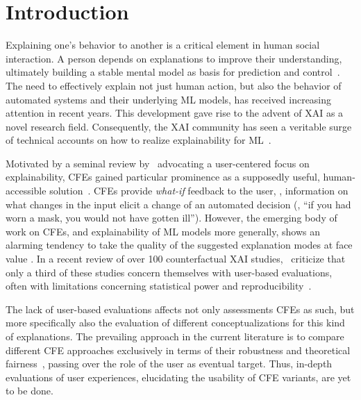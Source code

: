 \section{Introduction}\label{sec:introduction}

Explaining one's behavior to another is a critical element in human social interaction. 
A person depends on explanations to improve their understanding, ultimately building a stable mental model as basis for prediction and control~\citep{heider_psychology_1958}. 
The need to effectively explain not just human action, but also the behavior of automated systems and their underlying \gls{ML} models, has received increasing attention in recent years. This development gave rise to the advent of \gls{XAI} as a novel research field. 
Consequently, the \gls{XAI} community has seen a veritable surge of technical accounts on how to realize explainability for \gls{ML}~\citep{guidotti_survey_2019}. 

Motivated by a seminal review by~\citep{miller_explanation_2019} advocating a user-centered focus on explainability, \glspl{CFE} gained particular prominence as a supposedly useful, human-accessible solution~\citep{keane_if_2021}.
\glspl{CFE} provide \textit{what-if} feedback to the user, \ie, information on what changes in the input elicit a change of an automated decision (\ie, ``if you had worn a mask, you would not have gotten ill''). %
However, the emerging body of work on \glspl{CFE}, and explainability of \gls{ML} models more generally, shows an alarming tendency to take the quality of the suggested explanation modes at face value \citep{doshi-velez_towards_2017, offert_i_2017}.
In a recent review of over 100 counterfactual XAI studies,~\citeauthor{keane_if_2021} criticize that only a third of these studies concern themselves with user-based evaluations, often with limitations concerning statistical power and reproducibility~\citep{keane_if_2021}.

The lack of user-based evaluations affects not only assessments \glspl{CFE} as such, but more specifically also the evaluation of different conceptualizations for this kind of explanations.
The prevailing approach in the current literature is to compare different \gls{CFE} approaches exclusively in terms of their robustness and theoretical fairness~\citep{artelt_evaluating_2021}, passing over the role of the user as eventual target.  
Thus, in-depth evaluations of user experiences, elucidating the usability of \gls{CFE} variants, are yet to be done.

